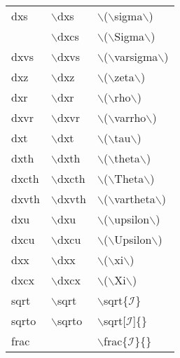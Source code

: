 \begin{longtable}{p{20mm}p{20mm}p{65mm}}
dxs & $\backslash$dxs & $\backslash$($\backslash$sigma$\backslash$)\\
 & $\backslash$dxcs & $\backslash$($\backslash$Sigma$\backslash$)\\
dxvs & $\backslash$dxvs & $\backslash$($\backslash$varsigma$\backslash$)\\
dxz & $\backslash$dxz & $\backslash$($\backslash$zeta$\backslash$)\\
dxr & $\backslash$dxr & $\backslash$($\backslash$rho$\backslash$)\\
dxvr & $\backslash$dxvr & $\backslash$($\backslash$varrho$\backslash$)\\
dxt & $\backslash$dxt & $\backslash$($\backslash$tau$\backslash$)\\
dxth & $\backslash$dxth & $\backslash$($\backslash$theta$\backslash$)\\
dxcth & $\backslash$dxcth & $\backslash$($\backslash$Theta$\backslash$)\\
dxvth & $\backslash$dxvth & $\backslash$($\backslash$vartheta$\backslash$)\\
dxu & $\backslash$dxu & $\backslash$($\backslash$upsilon$\backslash$)\\
dxcu & $\backslash$dxcu & $\backslash$($\backslash$Upsilon$\backslash$)\\
dxx & $\backslash$dxx & $\backslash$($\backslash$xi$\backslash$)\\
dxcx & $\backslash$dxcx & $\backslash$($\backslash$Xi$\backslash$)\\
sqrt & $\backslash$sqrt & $\backslash$sqrt\{$\mathcal{I}$\}\\
sqrto & $\backslash$sqrto & $\backslash$sqrt[$\mathcal{I}$]\{\}\\
frac &  & $\backslash$frac\{$\mathcal{I}$\}\{\}\\
\end{longtable}
\rmfamily

